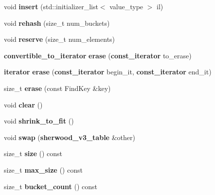 \begin{DoxyCompactItemize}
\item 
void {\bfseries insert} (std\+::initializer\+\_\+list$<$ value\+\_\+type $>$ il)\label{classska_1_1detailv3_1_1sherwood__v3__table_acb5b79c6c3184cd718c721e1532f692f}

\item 
void {\bfseries rehash} (size\+\_\+t num\+\_\+buckets)\label{classska_1_1detailv3_1_1sherwood__v3__table_a687ac4c927e81aca2769f7118b4e5c21}

\item 
void {\bfseries reserve} (size\+\_\+t num\+\_\+elements)\label{classska_1_1detailv3_1_1sherwood__v3__table_ad21abfcf8f6cab5268f777b76337c549}

\item 
{\bf convertible\+\_\+to\+\_\+iterator} {\bfseries erase} ({\bf const\+\_\+iterator} to\+\_\+erase)\label{classska_1_1detailv3_1_1sherwood__v3__table_af240d7373ecbeed71ca3eddc7b37d669}

\item 
{\bf iterator} {\bfseries erase} ({\bf const\+\_\+iterator} begin\+\_\+it, {\bf const\+\_\+iterator} end\+\_\+it)\label{classska_1_1detailv3_1_1sherwood__v3__table_ac2301f42fb2102ae6d39188bc1f3aed3}

\item 
size\+\_\+t {\bfseries erase} (const Find\+Key \&key)\label{classska_1_1detailv3_1_1sherwood__v3__table_a3a359b9c62c5db91a4c6474e7df64c9b}

\item 
void {\bfseries clear} ()\label{classska_1_1detailv3_1_1sherwood__v3__table_a8610b4acfeb3dea476ad95bf4bdd743c}

\item 
void {\bfseries shrink\+\_\+to\+\_\+fit} ()\label{classska_1_1detailv3_1_1sherwood__v3__table_a5dd497165958e5445a925113d6f7ab32}

\item 
void {\bfseries swap} ({\bf sherwood\+\_\+v3\+\_\+table} \&other)\label{classska_1_1detailv3_1_1sherwood__v3__table_a6b03fb89708db39b37a97bdcc62dac66}

\item 
size\+\_\+t {\bfseries size} () const \label{classska_1_1detailv3_1_1sherwood__v3__table_aa6159ec66e44afb5ceaf5c724588aeb8}

\item 
size\+\_\+t {\bfseries max\+\_\+size} () const \label{classska_1_1detailv3_1_1sherwood__v3__table_a90d1cc3ed7257d54a5ab15d1ee2b8ca8}

\item 
size\+\_\+t {\bfseries bucket\+\_\+count} () const \label{classska_1_1detailv3_1_1sherwood__v3__table_ab6ca95ddf24486c623e756f88603dc31}


\end{DoxyCompactItemize}
